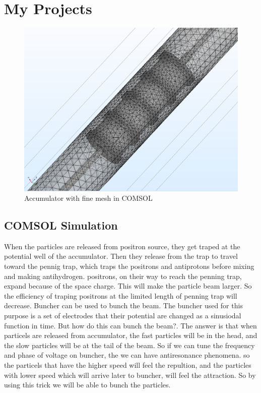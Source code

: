 \documentclass[12pt,a4paper]{article}
\begin{document}
\section{My Projects}

\begin{figure}[h]
\centering
\includegraphics[scale=0.3]{Mesh}
\caption{Accumulator with fine mesh in COMSOL}
\end{figure}

\subsection{COMSOL Simulation}
When the particles are released from positron source, they get traped at the potential well of the accumulator. Then they release from the trap to travel toward the pennig trap, which traps the positrons and antiprotons before mixing and making antihydrogen.  positrons, on their way to reach the penning trap, expand because of the space charge. This will make the particle beam larger. So the efficiency of traping positrons at the limited length of penning trap will decrease. Buncher can be used to bunch the beam. The buncher used for this purpose is a set of electrodes that their potential are changed as a sinusiodal function in time.
But how do this can bunch the beam?. The answer is that when particels are released from accumulator, the fast particles will be in the head, and the slow particles will be at the tail of the beam. So if we can tune the frequency and phase of voltage on buncher, the we can have antiresonance phenomena. so the particels that have the higher speed will feel the repultion, and the particles with lower speed which will arrive later to buncher, will feel the attraction.  So by using this trick we will be able to bunch the particles.
\end{document}
